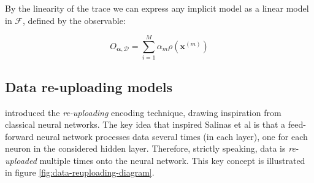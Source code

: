 By the linearity of the trace we can express any implicit model as a linear model in $\mathcal{F}$, defined by the 
observable:

\begin{equation}
    O_{\bm{\alpha}, \mathcal{D}} = \sum_{i=1}^M \alpha_m \rho(\bm{x}^{(m)})
\end{equation}


\subsection{Data re-uploading models}

\cite{P_rez_Salinas_2020} introduced the \textit{re-uploading} encoding technique,
drawing inspiration from classical neural networks.
The key idea that inspired Salinas et al is that a feed-forward neural network processes data several times
(in each layer), one for each neuron in the considered hidden layer. 
Therefore, strictly speaking, data is \textit{re-uploaded} multiple times onto the neural network.
This key concept is illustrated in figure \ref{fig:data-reuploading-diagram}.



